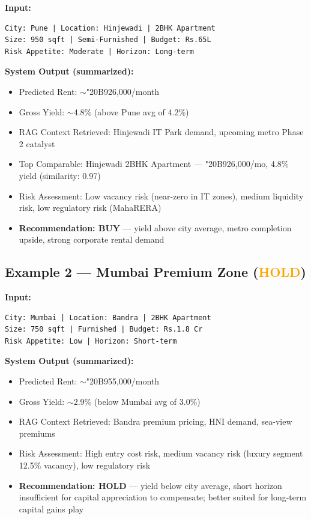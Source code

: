 \documentclass[12pt,a4paper]{article}
\newcommand{\rupee}{{\fontencoding{T1}\selectfont\char"20B9}}
\begin{document}
\textbf{Input:}
\begin{lstlisting}[language={}]
City: Pune | Location: Hinjewadi | 2BHK Apartment
Size: 950 sqft | Semi-Furnished | Budget: Rs.65L
Risk Appetite: Moderate | Horizon: Long-term
\end{lstlisting}

\textbf{System Output (summarized):}
\begin{itemize}[leftmargin=1.5em]
  \item Predicted Rent: $\sim$\rupee 26{,}000/month
  \item Gross Yield: $\sim$4.8\% (above Pune avg of 4.2\%)
  \item RAG Context Retrieved: Hinjewadi IT Park demand, upcoming metro Phase 2 catalyst
  \item Top Comparable: Hinjewadi 2BHK Apartment --- \rupee 26{,}000/mo, 4.8\% yield (similarity: 0.97)
  \item Risk Assessment: Low vacancy risk (near-zero in IT zones), medium liquidity risk, low regulatory risk (MahaRERA)
  \item \textbf{Recommendation: BUY} --- yield above city average, metro completion upside, strong corporate rental demand
\end{itemize}

\subsection{Example 2 --- Mumbai Premium Zone (\textcolor{orange}{HOLD})}

\textbf{Input:}
\begin{lstlisting}[language={}]
City: Mumbai | Location: Bandra | 2BHK Apartment
Size: 750 sqft | Furnished | Budget: Rs.1.8 Cr
Risk Appetite: Low | Horizon: Short-term
\end{lstlisting}

\textbf{System Output (summarized):}
\begin{itemize}[leftmargin=1.5em]
  \item Predicted Rent: $\sim$\rupee 55{,}000/month
  \item Gross Yield: $\sim$2.9\% (below Mumbai avg of 3.0\%)
  \item RAG Context Retrieved: Bandra premium pricing, HNI demand, sea-view premiums
  \item Risk Assessment: High entry cost risk, medium vacancy risk (luxury segment 12.5\% vacancy), low regulatory risk
  \item \textbf{Recommendation: HOLD} --- yield below city average, short horizon insufficient for capital appreciation to compensate; better suited for long-term capital gains play
\end{itemize}
\end{document}

